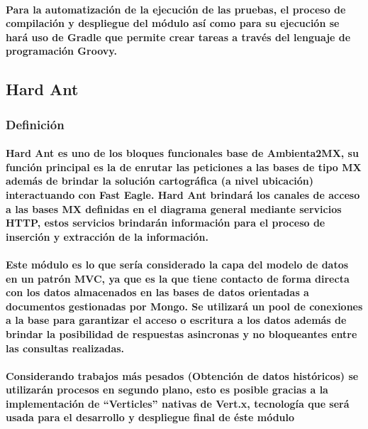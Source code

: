     \paragraph{Para la automatización de la ejecución de las pruebas, el proceso de compilación y despliegue del módulo así como para su ejecución se hará uso de Gradle que permite crear tareas a través del lenguaje de programación Groovy.}
  \subsection{Hard Ant}
    \subsubsection{Definición}
      \paragraph{Hard Ant es uno de los bloques funcionales base de Ambienta2MX, su función principal es la de enrutar las peticiones a las bases de tipo MX además de brindar la solución cartográfica (a nivel ubicación) interactuando con Fast Eagle. Hard Ant brindará los canales de acceso a las bases MX definidas en el diagrama general mediante servicios HTTP, estos servicios brindarán información para el proceso de inserción y extracción de la información. }
      \paragraph{Este módulo es lo que sería considerado la capa del modelo de datos en un patrón MVC, ya que es la que tiene contacto de forma directa con los datos almacenados en las bases de datos orientadas a documentos gestionadas por Mongo. Se utilizará un pool de conexiones a la base para garantizar el acceso o escritura a los datos además de brindar la posibilidad de respuestas asincronas y no bloqueantes entre las consultas realizadas.}
      \paragraph{Considerando trabajos más pesados (Obtención de datos históricos) se utilizarán procesos en segundo plano, esto es posible gracias a la implementación de ``Verticles'' nativas de Vert.x, tecnología que será usada para el desarrollo y despliegue final de éste módulo}
